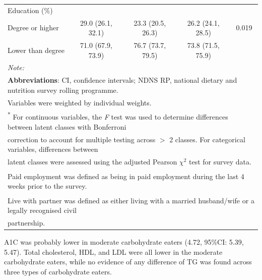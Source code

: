 \begin{table}[H]
\begin{tabular}[t]{lcccc}
	Education (\%) &  &  &  & \\
	\hspace{1em}Degree or higher & 29.0 (26.1, 32.1) & 23.3 (20.5, 26.3) & 26.2 (24.1, 28.5) & 0.019\\
	\hspace{1em}Lower than degree & 71.0 (67.9, 73.9) & 76.7 (73.7, 79.5) & 73.8 (71.5, 75.9) & \\
	\bottomrule
	\multicolumn{5}{l}{{\scriptsize \textit{Note: }}}\\
	\multicolumn{5}{l}{{\scriptsize \textbf{Abbreviations}: CI, confidence intervals; NDNS RP, national dietary and nutrition survey rolling programme.}}\\
	\multicolumn{5}{l}{{\scriptsize Variables were weighted by individual weights.}}\\
	\multicolumn{5}{l}{{\scriptsize \textsuperscript{*} For continuous variables, the \textit{F} test was used to determine differences between latent classes with Bonferroni}}\\ 
	\multicolumn{5}{l}{{\scriptsize correction to account for multiple testing across $>$ 2 classes. For categorical variables, differences between}}\\
	\multicolumn{5}{l}{{\scriptsize  latent classes were assessed using the adjusted Pearson $\chi^2$ test for survey data.}} \\
	\multicolumn{5}{l}{{\scriptsize \textsuperscript{\dag} Paid employment was defined as being in paid employment during the last 4 weeks prior to the survey.} }\\
	\multicolumn{5}{l}{{\scriptsize \textsuperscript{\ddag} Live with partner was defined as either living with a married husband/wife or a legally recognised civil}} \\
	\multicolumn{5}{l}{{\scriptsize partnership.}}\\
\end{tabular}

\end{table} 

A1C was probably lower in moderate carbohydrate eaters (4.72, 95\%CI: 5.39, 5.47). Total cholesterol, HDL, and LDL were all lower in the moderate carbohydrate eaters, while no evidence of any difference of TG was found across three types of carbohydrate eaters. 





